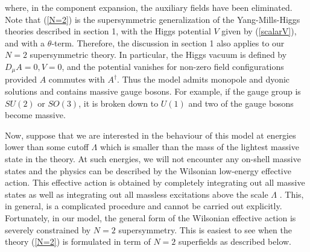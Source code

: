 where, in the component expansion, the auxiliary fields have been
eliminated. 
Note that (\ref{N=2}) is the supersymmetric generalization of the
Yang-Mills-Higgs theories described in section 1, with the Higgs
potential $V$ given by (\ref{scalarV}), and with a $\theta$-term.    
Therefore, the discussion in section 1 also applies to our $N=2$
supersymmetric theory. In particular, the Higgs vacuum is defined by
$D_\mu A=0, V=0$, and the potential vanishes for non-zero field
configurations provided $A$ commutes with $A^\dagger$. Thus the model
admits monopole and dyonic solutions and 
contains massive gauge bosons. For example, if the gauge group is
$SU(2)$ or $SO(3)$, it is broken down to $U(1)$ and two of the gauge
bosons become massive. 

Now, suppose that we are interested in the behaviour of this model at
energies lower than some cutoff $\Lambda$ which is smaller than the
mass of the lightest massive state in the theory. At such energies, we
will not encounter any on-shell massive states and the physics can be
described by the Wilsonian low-energy effective action. This effective
action is obtained by completely integrating out all massive states as
well as integrating out all massless excitations above the scale
$\Lambda$ \cite{SV1,SV2}. This, in general, is a complicated procedure and
cannot be carried out explicitly. Fortunately, in our model, the
general form of the Wilsonian effective action is severely constrained
by $N=2$ supersymmetry. This is easiest to see when the theory
(\ref{N=2}) is formulated in term of $N=2$ superfields as described
below. 
 
